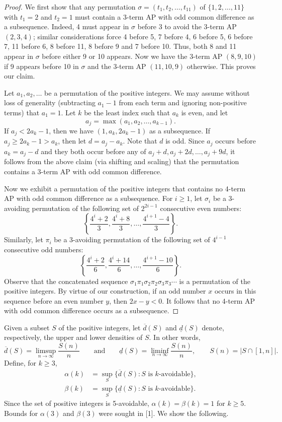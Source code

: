 \documentclass[10pt]{article}
\newcommand{\udens}{\overline{d}}
\newcommand{\ldens}{\underline{d}}
\begin{document}
\begin{proof}
We first show that any permutation
$\sigma=(t_1,t_2,\ldots,t_{11})$ of $\{1,2,\ldots,11\}$ with $t_1=2$ and
$t_2=1$ must contain a 3-term AP with odd common difference as a subsequence.
Indeed, 4 must appear in $\sigma$ before 3 to avoid the 3-term AP $(2,3,4)$;
similar considerations force 4 before 5, 7 before 4, 6 before 5, 6 before 7,
11 before 6, 8 before 11, 8 before 9 and 7 before 10. Thus, both 8 and 11
appear in $\sigma$ before either 9 or 10 appears. Now we have the 3-term AP
$(8,9,10)$ if 9 appears before 10 in $\sigma$ and the 3-term AP $(11,10,9)$
otherwise. This proves our claim.

Let $a_1,a_2,\ldots$ be a permutation of the positive integers. We may assume
without loss of generality (subtracting $a_1-1$ from each term and ignoring
non-positive terms) that $a_1=1$. Let $k$ be the least index such that $a_k$
is even, and let
\[
  a_j=\max(a_1,a_2,\ldots,a_{k-1}).
\]
If $a_j<2a_k-1$, then we have $(1,a_k,2a_k-1)$ as a subsequence. If
$a_j\geq 2a_k-1>a_k$, then let $d=a_j-a_k$. Note that $d$ is odd. Since
$a_j$ occurs before $a_k=a_j-d$ and they both occur before any of
$a_j+d,a_j+2d,\ldots,a_j+9d$, it follows from the above claim (via shifting
and scaling) that the permutation contains a 3-term AP with odd common
difference.

Now we exhibit a permutation of the positive integers that contains no
4-term AP with odd common difference as a subsequence. For $i\geq 1$, let
$\sigma_i$ be a 3-avoiding permutation of the following set of
$2^{2i-1}$ consecutive even numbers:
\[
  \left\{
    \frac{4^i+2}{3},\frac{4^i+8}{3},\ldots,
    \frac{4^{i+1}-4}{3}
  \right\}.
\]
Similarly, let $\pi_i$ be a 3-avoiding permutation of the following set of
$4^{i-1}$ consecutive odd numbers:
\[
  \left\{
    \frac{4^i+2}{6},\frac{4^i+14}{6},\ldots,
    \frac{4^{i+1}-10}{6}
  \right\}.
\]
Observe that the concatenated sequence
$\sigma_1\pi_1\sigma_2\pi_2\sigma_3\pi_3\cdots$ is a permutation of the
positive integers. By virtue of our construction, if an odd number $x$
occurs in this sequence before an even number $y$, then $2x-y<0$. It follows
that no 4-term AP with odd common difference occurs as a subsequence.
\end{proof}

Given a subset $S$ of the positive integers, let $\udens(S)$ and $\ldens(S)$
denote, respectively, the upper and lower densities of $S$. In other words,
\[
  \udens(S)=\limsup_{n\to\infty}\frac{S(n)}{n}
  \qquad\text{and}\qquad
  \ldens(S)=\liminf_{n\to\infty}\frac{S(n)}{n},
  \qquad
  S(n)=\lvert S\cap[1,n]\rvert.
\]
Define, for $k\geq 3$,
\[
\begin{aligned}
  \alpha(k)&=\sup_S\{\udens(S):S\text{ is }k\text{-avoidable}\},\\
  \beta(k)&=\sup_S\{\ldens(S):S\text{ is }k\text{-avoidable}\}.
\end{aligned}
\]
Since the set of positive integers is 5-avoidable,
$\alpha(k)=\beta(k)=1$ for $k\geq 5$. Bounds for $\alpha(3)$ and $\beta(3)$
were sought in [1]. We show the following.
\end{document}
